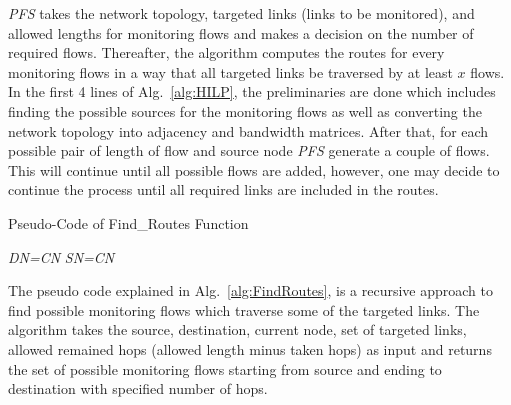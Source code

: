 \documentclass[10pt, journal, letterpaper]{IEEEtran}
\begin{document}
\textit{PFS} takes the network topology, targeted links (links to be monitored), and allowed lengths for monitoring flows and makes a decision on the number of required flows. Thereafter, the algorithm computes the routes for every monitoring flows in a way that all targeted links be traversed by at least $x$ flows. In the first 4 lines of Alg.~\ref{alg:HILP}, the preliminaries are done which includes finding the possible sources for the monitoring flows as well as converting the network topology into adjacency and bandwidth matrices. After that, for each possible pair of length of flow and source node \textit{PFS} generate a couple of flows. This will continue until all possible flows are added, however, one may decide to continue the process until all required links are included in the routes. 

\begin{algorithm}[!htbp]
	\caption{Pseudo-Code of Find\_Routes Function}
	\label{alg:FindRoutes}
	\small
	\allowdisplaybreaks
	\begin{algorithmic}[1]
    	\OUTPUT{$<>$}
    	    \EndIf
    	\Else
    	     \textit{DN=CN} \EndIf
    	     \textit{SN=CN} \EndIf
    	        \EndIf
    	    \EndFor
    	\EndIf
	\end{algorithmic}
\end{algorithm}

The pseudo code explained in Alg.~\ref{alg:FindRoutes}, is a recursive approach to find possible monitoring flows which traverse some of the targeted links. The algorithm takes the source, destination, current node, set of targeted links, allowed remained hops (allowed length minus taken hops) as input and returns the set of possible monitoring flows starting from source and ending to destination with specified number of hops.
\end{document}
